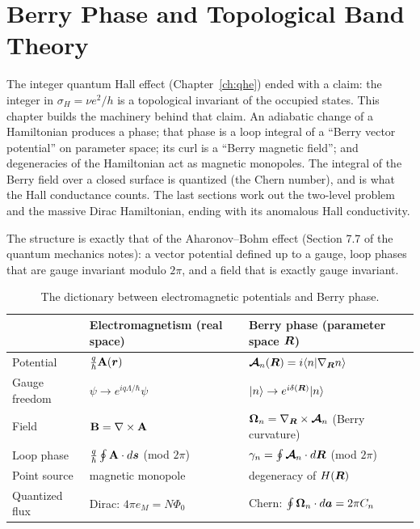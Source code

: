 \chapter{Berry Phase and Topological Band Theory}
\label{ch:topology}

The integer quantum Hall effect (Chapter~\ref{ch:qhe}) ended with a claim: the integer in $\sigma_H = \nu e^2/h$ is a topological invariant of the occupied states. This chapter builds the machinery behind that claim. An adiabatic change of a Hamiltonian produces a phase; that phase is a loop integral of a ``Berry vector potential'' on parameter space; its curl is a ``Berry magnetic field''; and degeneracies of the Hamiltonian act as magnetic monopoles. The integral of the Berry field over a closed surface is quantized (the Chern number), and is what the Hall conductance counts. The last sections work out the two-level problem and the massive Dirac Hamiltonian, ending with its anomalous Hall conductivity.

The structure is exactly that of the Aharonov--Bohm effect (Section 7.7 of the quantum mechanics notes): a vector potential defined up to a gauge, loop phases that are gauge invariant modulo $2\pi$, and a field that is exactly gauge invariant.

\begin{table}[ht]
\centering
\renewcommand{\arraystretch}{1.4}
\begin{tabular}{@{}lll@{}}
    \toprule
    & Electromagnetism (real space) & Berry phase (parameter space $\bm{R}$)\\
    \midrule
    Potential & $\frac{q}{\hbar}\cvect{A}(\lvect{r})$ & $\bm{\mathcal{A}}_n(\bm{R}) = i\langle n|\nabla_{\bm{R}}n\rangle$\\
    Gauge freedom & $\psi\to e^{iq\Lambda/\hbar}\psi$ & $|n\rangle\to e^{i\delta(\bm{R})}|n\rangle$\\
    Field & $\cvect{B} = \nabla\times\cvect{A}$ & $\bm{\Omega}_n = \nabla_{\bm{R}}\times\bm{\mathcal{A}}_n$ (Berry curvature)\\
    Loop phase & $\frac q\hbar\oint\cvect{A}\cdot d\lvect{s}$ (mod $2\pi$) & $\gamma_n = \oint\bm{\mathcal{A}}_n\cdot d\bm{R}$ (mod $2\pi$)\\
    Point source & magnetic monopole & degeneracy of $H(\bm{R})$\\
    Quantized flux & Dirac: $4\pi e_M = N\Phi_0$ & Chern: $\oint\bm{\Omega}_n\cdot d\bm{a} = 2\pi C_n$\\
    \bottomrule
\end{tabular}
\caption{The dictionary between electromagnetic potentials and Berry phase.}
\label{tab:berry-dictionary}
\end{table}

